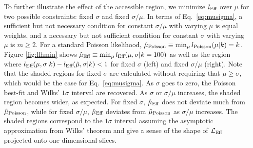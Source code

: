 To further illustrate the effect of the accessible region, we minimize $l_\textmd{Eff}$ over $\mu$ for two possible constraints: fixed $\sigma$ and fixed $\sigma/\mu$.
In terms of Eq.~\eqref{eq:musigma}, a sufficient but not necessary condition for constant $\sigma/\mu$ with varying $\mu$ is equal weights, and a necessary but not sufficient condition for constant $\sigma$ with varying $\mu$ is $m \geq 2$.
For a standard Poisson likelihood, $\hat{\mu}_\textmd{Poisson}\equiv \min_\mu l_{\textmd{Poisson}}(\mu|k) = k$.
Figure \ref{fig:llhmin} shows $\hat{\mu}_\textmd{Eff} \equiv \min_\mu l_\textmd{Eff}(\mu,\sigma|k=100)$ as well as the region where $l_\textmd{Eff}(\mu, \sigma|k) - l_\textmd{Eff}(\hat{\mu}, \sigma|k) < 1$ for fixed $\sigma$ (left) and fixed $\sigma/\mu$ (right).
Note that the shaded regions for fixed $\sigma$ are calculated without requiring that $\mu \geq \sigma$, which would be the case for Eq.~\eqref{eq:musigma}.
As $\sigma$ goes to zero, the Poisson best-fit and Wilks' $1\sigma$ interval are recovered.
As $\sigma$ or $\sigma/\mu$ increases, the shaded region becomes wider, as expected.
For fixed $\sigma$, $\hat{\mu}_\textmd{Eff}$ does not deviate much from $\hat{\mu}_\textmd{Poisson}$, while for fixed $\sigma/\mu$, $\hat{\mu}_\textmd{Eff}$ deviates from $\hat{\mu}_\textmd{Poisson}$ as $\sigma/\mu$ increases.
The shaded regions correspond to the $1\sigma$ interval assuming the asymptotic approximation from Wilks' theorem and give a sense of the shape of $\mathcal{L}_\textmd{Eff}$ projected onto one-dimensional slices.

